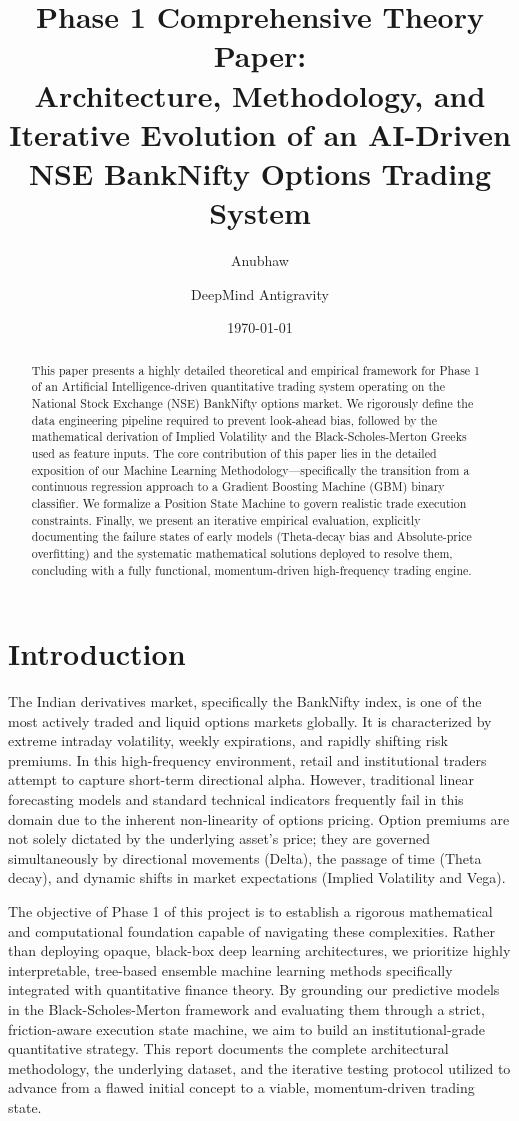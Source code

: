 \documentclass[11pt, a4paper]{article}
\title{\textbf{Phase 1 Comprehensive Theory Paper: \\ Architecture, Methodology, and Iterative Evolution of an AI-Driven NSE BankNifty Options Trading System}}
\author{Anubhaw \and DeepMind Antigravity}
\date{\today}
\begin{document}
\maketitle

\begin{abstract}
This paper presents a highly detailed theoretical and empirical framework for Phase 1 of an Artificial Intelligence-driven quantitative trading system operating on the National Stock Exchange (NSE) BankNifty options market. We rigorously define the data engineering pipeline required to prevent look-ahead bias, followed by the mathematical derivation of Implied Volatility and the Black-Scholes-Merton Greeks used as feature inputs. The core contribution of this paper lies in the detailed exposition of our Machine Learning Methodology—specifically the transition from a continuous regression approach to a Gradient Boosting Machine (GBM) binary classifier. We formalize a Position State Machine to govern realistic trade execution constraints. Finally, we present an iterative empirical evaluation, explicitly documenting the failure states of early models (Theta-decay bias and Absolute-price overfitting) and the systematic mathematical solutions deployed to resolve them, concluding with a fully functional, momentum-driven high-frequency trading engine.
\end{abstract}

\section{Introduction}
The Indian derivatives market, specifically the BankNifty index, is one of the most actively traded and liquid options markets globally. It is characterized by extreme intraday volatility, weekly expirations, and rapidly shifting risk premiums. In this high-frequency environment, retail and institutional traders attempt to capture short-term directional alpha. However, traditional linear forecasting models and standard technical indicators frequently fail in this domain due to the inherent non-linearity of options pricing. Option premiums are not solely dictated by the underlying asset's price; they are governed simultaneously by directional movements (Delta), the passage of time (Theta decay), and dynamic shifts in market expectations (Implied Volatility and Vega).

The objective of Phase 1 of this project is to establish a rigorous mathematical and computational foundation capable of navigating these complexities. Rather than deploying opaque, black-box deep learning architectures, we prioritize highly interpretable, tree-based ensemble machine learning methods specifically integrated with quantitative finance theory. By grounding our predictive models in the Black-Scholes-Merton framework and evaluating them through a strict, friction-aware execution state machine, we aim to build an institutional-grade quantitative strategy. This report documents the complete architectural methodology, the underlying dataset, and the iterative testing protocol utilized to advance from a flawed initial concept to a viable, momentum-driven trading state.
\end{document}
